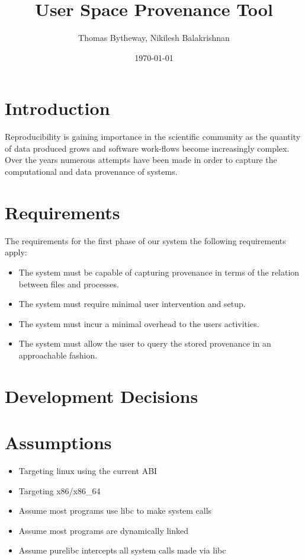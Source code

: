 \documentclass[10pt]{article}
\title{User Space Provenance Tool}
\date{\today}
\author{Thomas Bytheway, Nikilesh Balakrishnan}
\begin{document}
\maketitle
\section{Introduction}
Reproducibility is gaining importance in the scientific community as the quantity of data produced grows and software work-flows become increasingly complex. Over the years numerous attempts have been made in order to capture the computational and data provenance of systems.


\section{Requirements}
The requirements for the first phase of our system the following requirements apply:
\begin{itemize}
\item The system must be capable of capturing provenance in terms of the relation between files and processes.
\item The system must require minimal user intervention and setup.
\item The system must incur a minimal overhead to the users activities.
\item The system must allow the user to query the stored provenance in an approachable fashion.
\end{itemize}

\section{Development Decisions}



\section{Assumptions}
\begin{itemize}
\item Targeting linux using the current ABI
\item Targeting x86/x86\_64
\item Assume most programs use libc to make system calls
\item Assume most programs are dynamically linked
\item Assume purelibc intercepts all system calls made via libc
\end{itemize}
\end{document}
